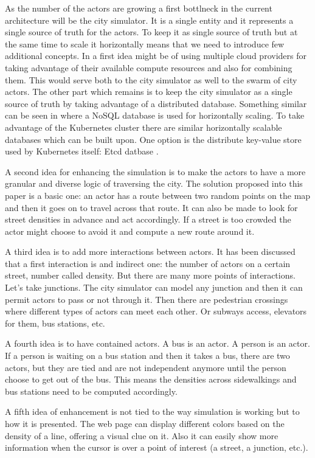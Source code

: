 \documentclass[conference]{IEEEtran}
\begin{document}
As the number of the actors are growing a first bottlneck in the current architecture will be the city simulator. It is a single entity and it represents a single source of truth for the actors. To keep it as single source of truth but at the same time to scale it horizontally means that we need to introduce few additional concepts. In \cite{6847479} a first idea might be of using multiple cloud providers for taking advantage of their available compute resources and also for combining them. This would serve both to the city simulator as well to the swarm of city actors. The other part which remains is to keep the city simulator as a single source of truth by taking advantage of a distributed database. Something similar can be seen in \cite{8509417} where a NoSQL database is used for horizontally scaling. To take advantage of the Kubernetes cluster there are similar horizontally scalable databases which can be built upon. One option is the distribute key-value store used by Kubernetes itself: Etcd datbase \citep{etcd}.

A second idea for enhancing the simulation is to make the actors to have a more granular and diverse logic of traversing the city. The solution proposed into this paper is a basic one: an actor has a route between two random points on the map and then it goes on to travel across that route. It can also be made to look for street densities in advance and act accordingly. If a street is too crowded the actor might choose to avoid it and compute a new route around it.

A third idea is to add more interactions between actors. It has been discussed that a first interaction is and indirect one: the number of actors on a certain street, number called density. But there are many more points of interactions. Let's take junctions. The city simulator can model any junction and then it can permit actors to pass or not through it. Then there are pedestrian crossings where different types of actors can meet each other. Or subways access, elevators for them, bus stations, etc.

A fourth idea is to have contained actors. A bus is an actor. A person is an actor. If a person is waiting on a bus station and then it takes a bus, there are two actors, but they are tied and are not independent anymore until the person choose to get out of the bus. This means the densities across sidewalkings and bus stations need to be computed accordingly.

A fifth idea of enhancement is not tied to the way simulation is working but to how it is presented. The web page can display different colors based on the density of a line, offering a visual clue on it. Also it can easily show more information when the cursor is over a point of interest (a street, a junction, etc.).


\vspace{12pt}
\end{document}
